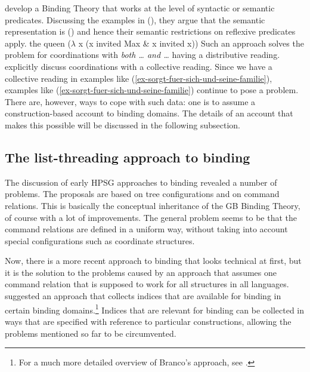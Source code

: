 \documentclass[output=paper,biblatex,babelshorthands,newtxmath,draftmode,colorlinks,citecolor=brown]{langscibook}
\begin{document}
\citet{RR93a} develop a Binding Theory that works at the level of syntactic or semantic
predicates. Discussing the examples in (), they argue that the semantic representation is
() and hence their semantic restrictions on reflexive predicates apply.
\eal
{}
\zl
\ea
the queen ($\lambda$ x (x invited Max \& x invited x))
\z
Such an approach solves the problem for coordinations with \emph{both \ldots{} and \ldots} having a
distributive reading. \citet[]{RR93a} explicitly discuss coordinations with a collective
reading. Since we have a collective reading in examples like
(\ref{ex-sorgt-fuer-sich-und-seine-familie}), examples like (\ref{ex-sorgt-fuer-sich-und-seine-familie}) continue to pose a problem. There are,
however, ways to cope with such data: one is to assume a construction-based account to binding
domains. The details of an account that makes this possible will be discussed in the following subsection.


\subsection{The list-threading approach to binding}


The discussion of early HPSG approaches to binding revealed a number of problems. The proposals are
based on tree configurations and on command relations. This is basically the conceptual inheritance
of the GB Binding Theory, of course with a lot of improvements. The general problem seems to be that
the command relations are defined in a uniform way, without taking into account special configurations such as coordinate structures.

Now, there is a more recent approach to binding that looks technical at first, but it is the
solution to the problems caused by an approach that assumes one command relation that is supposed
to work for all structures in all languages. \citet{Branco2002a} suggested an approach that collects
indices that are available for binding in certain binding domains.\footnote{%
For a much more detailed overview of Branco's approach, see .
} 
Indices that are relevant for binding can be collected in ways that are specified with reference to particular constructions, allowing the problems mentioned so far to be circumvented.
\end{document}
